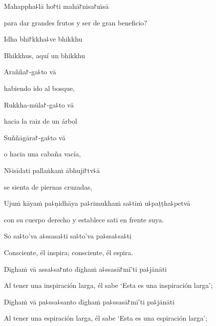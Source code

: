 Mahappha꜕lā ho꜓ti mahā꜓nisa꜓ṁsā

\begin{english}
  para dar grandes frutos y ser de gran beneficio?
\end{english}

Idha bhi꜓kkha꜕ve bhikkhu

\begin{english}
  Bhikkhus, aquí un bhikkhu
\end{english}

Arañña꜓-ga꜕to vā

\begin{english}
  habiendo ido al bosque,
\end{english}

Rukkha-mūla꜓-ga꜕to vā

\begin{english}
  hacia la raiz de un árbol
\end{english}

Suññāgāra꜓-ga꜕to vā

\begin{english}
  o hacia una cabaña vacía,
\end{english}

N꜕isīdati pallaṅkaṁ ābhuji꜓tv꜕ā

\begin{english}
  se sienta de piernas cruzadas,
\end{english}

Ujuṁ kāyaṁ pa꜕ṇidhāya pa꜕rimukhaṁ sa꜕tiṁ u꜕paṭṭha꜕petvā

\begin{english}
  con su cuerpo derecho y establece sati en frente suya.
\end{english}

So sa꜕to'va a꜕ssasa꜕ti sa꜕to'va pa꜕ssa꜕sa꜕ti

\begin{english}
  Consciente, él inspira; consciente, él espira.
\end{english}

Dīghaṁ vā assa꜕sa꜓nto dīghaṁ a꜕ssasā꜓mī'ti pa꜕jānāti

\begin{english}
  Al tener una inspiración larga, él sabe ‘Esta es una inspiración larga’;
\end{english}

Dīghaṁ vā pa꜕ssa꜕santo dīghaṁ pa꜕ssasā꜓mī'ti pa꜕jānāti

\begin{english}
  Al tener una espiración larga, él sabe ‘Esta es una espiración larga’;
\end{english}

